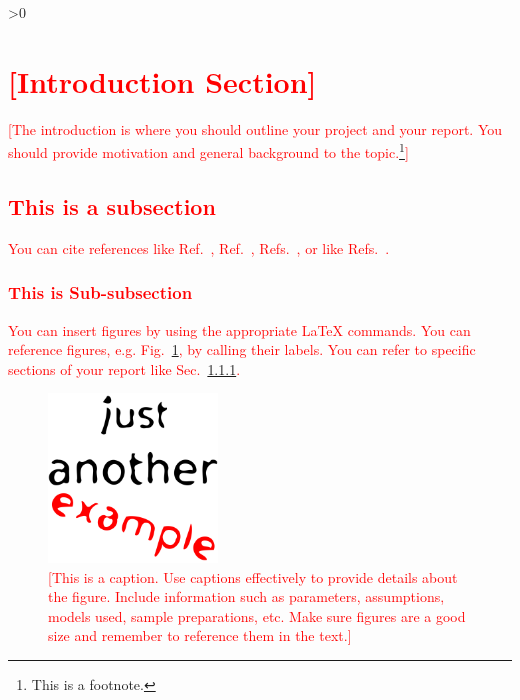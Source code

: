 \documentclass[aps,pra,a4paper,nofootinbib,onecolumn,tightenlines,longbibliography,12pt,amsfonts,amssymb,amsmath,floatfix]{revtex4-2} %
\begin{document}
\ifnum\totaltables>0
\newpage
\listoftables
{}
\fi





\newpage
{}

\section{\textcolor{red}{[Introduction Section]}}

\textcolor{red}{[The introduction is where you should outline your project and your report. You should provide motivation and general background to the topic.\footnote{This is a footnote.}]}

\subsection{\textcolor{red}{This is a subsection}}

\textcolor{red}{You can cite references like Ref.~\cite{knuthwebsite}, Ref.~\cite{einstein},  Refs.~\cite{einstein,latexcompanion}, or like Refs.~\cite{einstein,latexcompanion,knuthwebsite,Senn:2009}.}

\subsubsection{\textcolor{red}{This is Sub-subsection}}
\label{sec:subssubsectionref} %

\textcolor{red}{You can insert figures by using the appropriate {\LaTeX} commands. You can reference figures, e.g. Fig.~\ref{fig:example1}, by calling their labels. You can refer to specific sections of your report like Sec.~\ref{sec:subssubsectionref}.}

\begin{figure}[b] %
\includegraphics[width=0.4\textwidth]{example.png}
\caption[\textcolor{red}{Short Caption for List of Figures}]{%
\label{fig:example1} %
\textcolor{red}{[This is a caption. Use captions effectively to provide details about the figure. Include information such as parameters, assumptions, models used, sample preparations, etc. Make sure figures are a good size and remember to reference them in the text.]}}
\end{figure}
\end{document}
